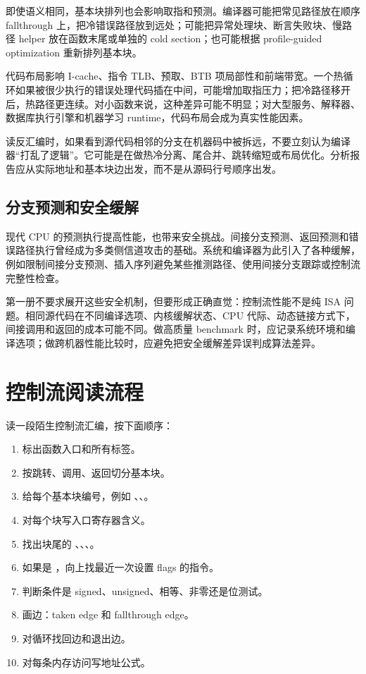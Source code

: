 即使语义相同，基本块排列也会影响取指和预测。编译器可能把常见路径放在顺序 fallthrough 上，把冷错误路径放到远处；可能把异常处理块、断言失败块、慢路径 helper 放在函数末尾或单独的 cold section；也可能根据 profile-guided optimization 重新排列基本块。

代码布局影响 I-cache、指令 TLB、预取、BTB 项局部性和前端带宽。一个热循环如果被很少执行的错误处理代码插在中间，可能增加取指压力；把冷路径移开后，热路径更连续。对小函数来说，这种差异可能不明显；对大型服务、解释器、数据库执行引擎和机器学习 runtime，代码布局会成为真实性能因素。

读反汇编时，如果看到源代码相邻的分支在机器码中被拆远，不要立刻认为编译器“打乱了逻辑”。它可能是在做热冷分离、尾合并、跳转缩短或布局优化。分析报告应从实际地址和基本块边出发，而不是从源码行号顺序出发。

\subsection{分支预测和安全缓解}

现代 CPU 的预测执行提高性能，也带来安全挑战。间接分支预测、返回预测和错误路径执行曾经成为多类侧信道攻击的基础。系统和编译器为此引入了各种缓解，例如限制间接分支预测、插入序列避免某些推测路径、使用间接分支跟踪或控制流完整性检查。

第一册不要求展开这些安全机制，但要形成正确直觉：控制流性能不是纯 ISA 问题。相同源代码在不同编译选项、内核缓解状态、CPU 代际、动态链接方式下，间接调用和返回的成本可能不同。做高质量 benchmark 时，应记录系统环境和编译选项；做跨机器性能比较时，应避免把安全缓解差异误判成算法差异。

\section{控制流阅读流程}

读一段陌生控制流汇编，按下面顺序：

\begin{enumerate}
  \item 标出函数入口和所有标签。
  \item 按跳转、调用、返回切分基本块。
  \item 给每个基本块编号，例如 、、。
  \item 对每个块写入口寄存器含义。
  \item 找出块尾的 、、、。
  \item 如果是 ，向上找最近一次设置 flags 的指令。
  \item 判断条件是 signed、unsigned、相等、非零还是位测试。
  \item 画边：taken edge 和 fallthrough edge。
  \item 对循环找回边和退出边。
  \item 对每条内存访问写地址公式。
\end{enumerate}

